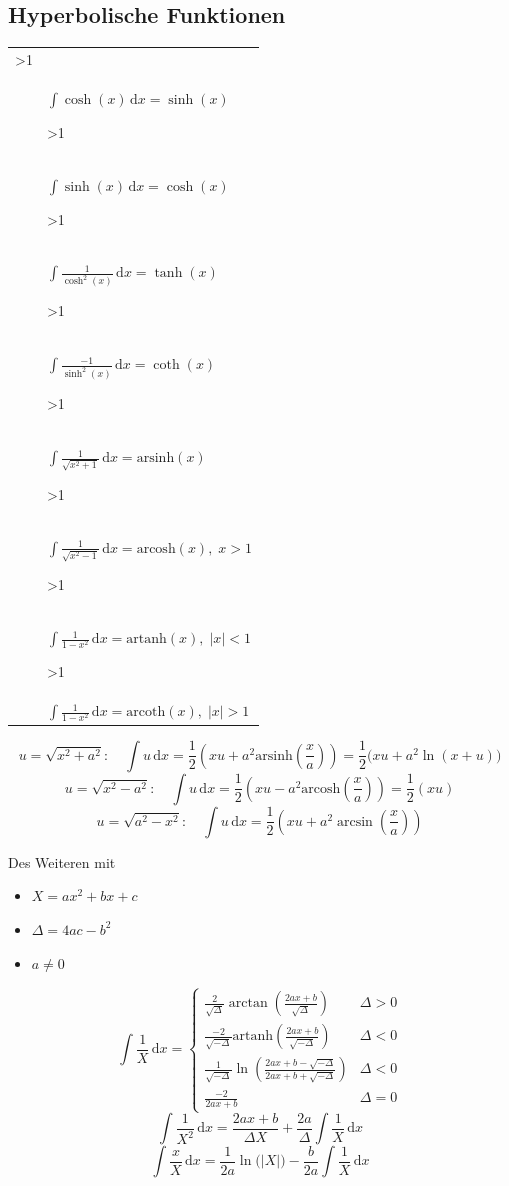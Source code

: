 \documentclass[english,ngerman,fontsize=9pt,intoc,index=totoc,refpage,listof=totoc,draft]{scrbook}
\numberwithin{equation}{section}
\newcommand{\intd}{\,\mathrm{d}}
\newcounter{mathtableformulacounter}
\newenvironment{mathtable}[1][1.6667em]
{
  \noindent\begin{center}
    \setcounter{mathtableformulacounter}{1}
    \newcommand{\cell}{
      \ifnum\value{mathtableformulacounter}>1
	\ifodd\value{mathtableformulacounter}
	  \\[#1]
	\else
	  &
	\fi
      \fi
      \stepcounter{mathtableformulacounter}
    }
    \begin{tabular}{l|l}
}
{
    \end{tabular}
  \end{center}
}
\begin{document}
\subsection{Hyperbolische Funktionen}
\begin{mathtable}
  \cell $\displaystyle \int\cosh(x)\intd x=\sinh(x) $
  \cell $\displaystyle \int\sinh(x)\intd x=\cosh(x) $
  \cell $\displaystyle \int\frac{1}{\cosh^2(x)}\intd x=\tanh(x) $
  \cell $\displaystyle \int\frac{-1}{\sinh^2(x)}\intd x=\coth(x) $
  \cell $\displaystyle \int\frac{1}{\sqrt{x^2+1}}\intd x=\mathrm{arsinh}(x) $
  \cell $\displaystyle \int\frac{1}{\sqrt{x^2-1}}\intd x=\mathrm{arcosh}(x),\; x>1 $
  \cell $\displaystyle \int\frac{1}{1-x^2}\intd x=\mathrm{artanh}(x),\; \lvert x \rvert<1 $
  \cell $\displaystyle \int\frac{1}{1-x^2}\intd x=\mathrm{arcoth}(x),\; \lvert x \rvert>1 $
\end{mathtable}

\[ u=\sqrt{x^2+a^2}:\quad\int u\intd x=\frac{1}{2}\left(xu+a^2\mathrm{arsinh}\left(\frac{x}{a}\right)\right)=\frac{1}{2}\bigl(xu+a^2\ln(x+u)\bigr) \]
\[ u=\sqrt{x^2-a^2}:\quad\int u\intd x=\frac{1}{2}\left(xu-a^2\mathrm{arcosh}\left(\frac{x}{a}\right)\right)=\frac{1}{2}(xu) \]
\[ u=\sqrt{a^2-x^2}:\quad\int u\intd x=\frac{1}{2}\left(xu+a^2\arcsin\left(\frac{x}{a}\right)\right) \]

Des Weiteren mit
\begin{itemize}
  \item $X=ax^{2}+bx+c$
  \item $\varDelta=4ac-b^{2}$
  \item $a\neq0$
\end{itemize}
\[
  \int\frac{1}{X}\intd x=
  \begin{cases}
  	\frac{2}{\sqrt{\varDelta}}\arctan\left(\frac{2ax+b}{\sqrt{\varDelta}}\right)                       & \varDelta>0 \\
  	\frac{-2}{\sqrt{-\varDelta}}\mathrm{artanh}\left(\frac{2ax+b}{\sqrt{-\varDelta}}\right)            & \varDelta<0 \\
  	\frac{1}{\sqrt{-\varDelta}}\ln\left(\frac{2ax+b-\sqrt{-\varDelta}}{2ax+b+\sqrt{-\varDelta}}\right) & \varDelta<0 \\
  	\frac{-2}{2ax+b}                                                                                   & \varDelta=0
  \end{cases}
\]
\[ \int\frac{1}{X^2}\intd x=\frac{2ax+b}{\varDelta X}+\frac{2a}{\varDelta}\int\frac{1}{X}\intd x \]
\[ \int\frac{x}{X}\intd x=\frac{1}{2a}\ln\bigl(\lvert X \rvert\bigr)-\frac{b}{2a}\int\frac{1}{X}\intd x \]
\end{document}
